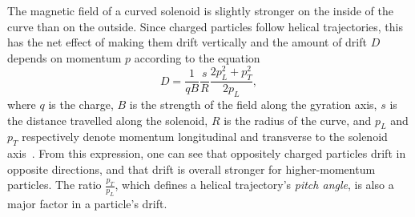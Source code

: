 The magnetic field of a curved solenoid is slightly stronger on the inside of
the curve than on the outside. Since charged particles follow helical
trajectories, this has the net effect of making them drift vertically and the
amount of drift $D$ depends on momentum $p$ according to the equation
\begin{equation*}
    D = \frac{1}{q B} \frac{s}{R} \frac{2 p^2_L + p^2_T}{2 p_L},
\end{equation*}
where $q$ is the charge, $B$ is the strength of the field along the gyration
axis, $s$ is the distance travelled along the solenoid, $R$ is the radius of the
curve, and $p_L$ and $p_T$ respectively denote momentum longitudinal and
transverse to the solenoid axis~\cite{ben_thesis}. From this expression, one can
see that oppositely charged particles drift in opposite directions, and that
drift is overall stronger for higher-momentum particles. The ratio
$\frac{p_T}{p_L}$, which defines a helical trajectory's \emph{pitch angle}, is
also a major factor in a particle's drift.

